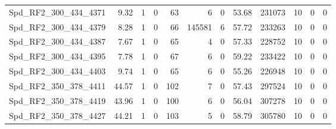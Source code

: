 \begin{longtable}[c]{@{}lrrrrrrrrrrr@{}}
Spd\_RF2\_300\_434\_4371      & 9.32                   & 1                       & 0                       & 63                     & 6                       & 0                       & 53.68                   & 231073                   & 10                       & 0                        & 0                        \\
Spd\_RF2\_300\_434\_4379      & 8.28                   & 1                       & 0                       & 66                     & 145581                  & 6                       & 57.72                   & 233263                   & 10                       & 0                        & 0                        \\
Spd\_RF2\_300\_434\_4387      & 7.67                   & 1                       & 0                       & 65                     & 4                       & 0                       & 57.33                   & 228752                   & 10                       & 0                        & 0                        \\
Spd\_RF2\_300\_434\_4395      & 7.78                   & 1                       & 0                       & 67                     & 6                       & 0                       & 59.22                   & 233422                   & 10                       & 0                        & 0                        \\
Spd\_RF2\_300\_434\_4403      & 9.74                   & 1                       & 0                       & 65                     & 6                       & 0                       & 55.26                   & 226948                   & 10                       & 0                        & 0                        \\
Spd\_RF2\_350\_378\_4411      & 44.57                  & 1                       & 0                       & 102                    & 7                       & 0                       & 57.43                   & 297524                   & 10                       & 0                        & 0                        \\
Spd\_RF2\_350\_378\_4419      & 43.96                  & 1                       & 0                       & 100                    & 6                       & 0                       & 56.04                   & 307278                   & 10                       & 0                        & 0                        \\
Spd\_RF2\_350\_378\_4427      & 44.21                  & 1                       & 0                       & 103                    & 5                       & 0                       & 58.79                   & 305780                   & 10                       & 0                        & 0                        \\

\end{longtable}
